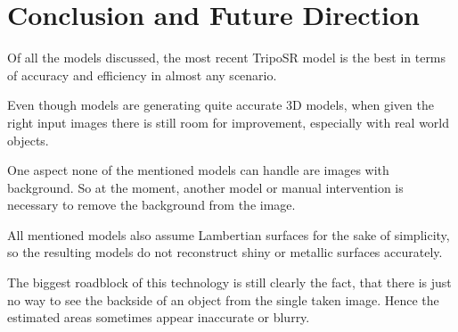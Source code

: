 



\section{Conclusion and Future Direction}
Of all the models discussed, the most recent TripoSR model is the best in terms of accuracy and efficiency in almost any scenario.

Even though models are generating quite accurate 3D models, when given the right input images there is still room for improvement, especially with real world objects.

One aspect none of the mentioned models can handle are images with background. So at the moment, another model or manual intervention is necessary to remove the background from the image.

All mentioned models also assume Lambertian surfaces for the sake of simplicity, so the resulting models do not reconstruct shiny or metallic surfaces accurately.

The biggest roadblock of this technology is still clearly the fact, that there is just no way to see the backside of an object from the single taken image. Hence the estimated areas sometimes appear inaccurate or blurry.


